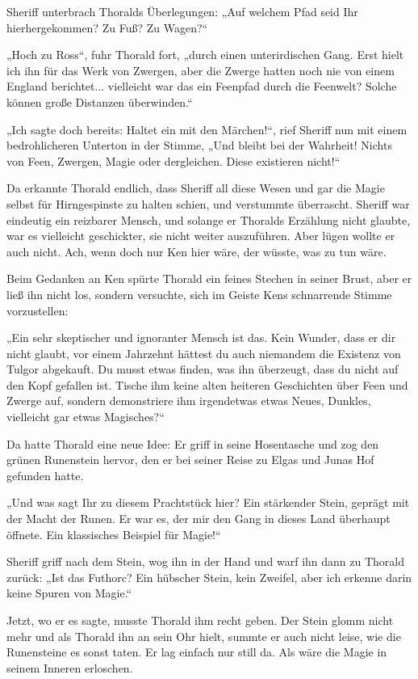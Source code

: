 Sheriff unterbrach Thoralds Überlegungen: „Auf welchem Pfad seid Ihr hierhergekommen? Zu Fuß? Zu Wagen?“

„Hoch zu Ross“, fuhr Thorald fort, „durch einen unterirdischen Gang. Erst hielt ich ihn für das Werk von Zwergen, aber die Zwerge hatten noch nie von einem England berichtet... vielleicht war das ein Feenpfad durch die Feenwelt? Solche können große Distanzen überwinden.“

„Ich sagte doch bereits: Haltet ein mit den Märchen!“, rief Sheriff nun mit einem bedrohlicheren Unterton in der Stimme, „Und bleibt bei der Wahrheit! Nichts von Feen, Zwergen, Magie oder dergleichen. Diese existieren nicht!“

Da erkannte Thorald endlich, dass Sheriff all diese Wesen und gar die Magie selbst für Hirngespinste zu halten schien, und verstummte überrascht. Sheriff war eindeutig ein reizbarer Mensch, und solange er Thoralds Erzählung nicht glaubte, war es vielleicht geschickter, sie nicht weiter auszuführen. Aber lügen wollte er auch nicht. Ach, wenn doch nur Ken hier wäre, der wüsste, was zu tun wäre.

Beim Gedanken an Ken spürte Thorald ein feines Stechen in seiner Brust, aber er ließ ihn nicht los, sondern versuchte, sich im Geiste Kens schnarrende Stimme vorzustellen:

„Ein sehr skeptischer und ignoranter Mensch ist das. Kein Wunder, dass er dir nicht glaubt, vor einem Jahrzehnt hättest du auch niemandem die Existenz von Tulgor abgekauft. Du musst etwas finden, was ihn überzeugt, dass du nicht auf den Kopf gefallen ist. Tische ihm keine alten heiteren Geschichten über Feen und Zwerge auf, sondern demonstriere ihm irgendetwas etwas Neues, Dunkles, vielleicht gar etwas Magisches?“

Da hatte Thorald eine neue Idee: Er griff in seine Hosentasche und zog den grünen Runenstein hervor, den er bei seiner Reise zu Elgas und Junas Hof gefunden hatte.

„Und was sagt Ihr zu diesem Prachtstück hier? Ein stärkender Stein, geprägt mit der Macht der Runen. Er war es, der mir den Gang in dieses Land überhaupt öffnete. Ein klassisches Beispiel für Magie!“

Sheriff griff nach dem Stein, wog ihn in der Hand und warf ihn dann zu Thorald zurück: „Ist das Futhorc? Ein hübscher Stein, kein Zweifel, aber ich erkenne darin keine Spuren von Magie.“

Jetzt, wo er es sagte, musste Thorald ihm recht geben. Der Stein glomm nicht mehr und als Thorald ihn an sein Ohr hielt, summte er auch nicht leise, wie die Runensteine es sonst taten. Er lag einfach nur still da. Als wäre die Magie in seinem Inneren erloschen.

